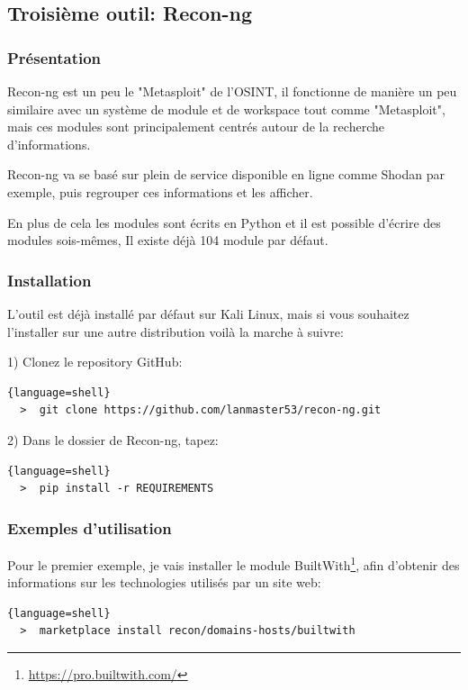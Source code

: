 \subsection{Troisième outil: Recon-ng}

\subsubsection{Présentation}
Recon-ng est un peu le "Metasploit" de l'OSINT, il fonctionne de manière un peu similaire avec un système de module et de workspace tout comme "Metasploit",
mais ces modules sont principalement centrés autour de la recherche d'informations.

Recon-ng va se basé sur plein de service disponible en ligne comme Shodan par exemple, puis regrouper
ces informations et les afficher.

En plus de cela les modules sont écrits en Python et il est possible d'écrire des modules sois-mêmes, Il
existe déjà 104 module par défaut.

\subsubsection{Installation}
L'outil est déjà installé par défaut sur Kali Linux, mais si vous souhaitez l'installer sur une autre
distribution voilà la marche à suivre:

1) Clonez le repository GitHub:

\begin{lstlisting}{language=shell}
  >  git clone https://github.com/lanmaster53/recon-ng.git
\end{lstlisting}
  
2) Dans le dossier de Recon-ng, tapez:

\begin{lstlisting}{language=shell}
  >  pip install -r REQUIREMENTS
\end{lstlisting}

\subsubsection{Exemples d'utilisation}
Pour le premier exemple, je vais installer le module BuiltWith\footnote{\url{https://pro.builtwith.com/}}, afin d'obtenir des informations
sur les technologies utilisés par un site web:

\begin{lstlisting}{language=shell}
  >  marketplace install recon/domains-hosts/builtwith
\end{lstlisting}

